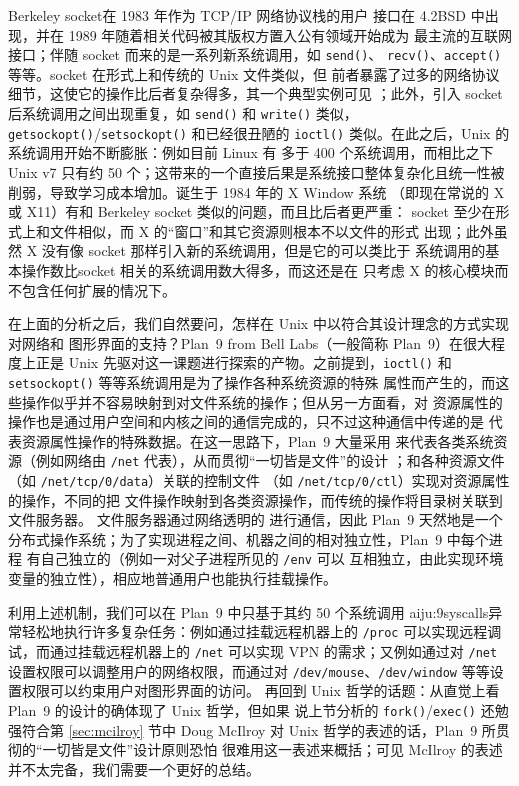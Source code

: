 Berkeley socket在 1983 年作为 TCP/IP 网络协议栈的用户
接口在 4.2BSD 中出现，并在 1989 年随着相关代码被其版权方置入公有领域开始成为
最主流的互联网接口；伴随 socket 而来的是一系列新系统调用，如 \verb|send()|、%
\verb|recv()|、\verb|accept()| 等等。socket 在形式上和传统的 Unix 文件类似，但
前者暴露了过多的网络协议细节，这使它的操作比后者复杂得多，其一个典型实例可见
\parencite{pike2001}；此外，引入 socket 后系统调用之间出现重复，如 \verb|send()|
和 \verb|write()| 类似，\verb|getsockopt()|/\verb|setsockopt()| 和已经很丑陋的
\verb|ioctl()| 类似。在此之后，Unix 的系统调用开始不断膨胀：例如目前 Linux 有
多于 400 个系统调用，而相比之下 Unix v7 只有约 50
个；这带来的一个直接后果是系统接口整体复杂化且统一性被
削弱，导致学习成本增加。诞生于 1984 年的 X Window 系统%
（即现在常说的 X 或 X11）有和 Berkeley socket 类似的问题，而且比后者更严重：%
socket 至少在形式上和文件相似，而 X 的“窗口”和其它资源则根本不以文件的形式
出现；此外虽然 X 没有像 socket 那样引入新的系统调用，但是它的可以类比于
系统调用的基本操作数比socket 相关的系统调用数大得多，而这还是在
只考虑 X 的核心模块而不包含任何扩展的情况下。

在上面的分析之后，我们自然要问，怎样在 Unix 中以符合其设计理念的方式实现对网络和
图形界面的支持？Plan~9 from Bell Labs（一般简称 Plan~9）在很大程度上正是 Unix
先驱对这一课题进行探索的产物。之前提到，\verb|ioctl()|
和 \verb|setsockopt()| 等等系统调用是为了操作各种系统资源的特殊
属性而产生的，而这些操作似乎并不容易映射到对文件系统的操作；但从另一方面看，对
资源属性的操作也是通过用户空间和内核之间的通信完成的，只不过这种通信中传递的是
代表资源属性操作的特殊数据。在这一思路下，Plan~9 大量采用%
来代表各类系统资源（例如网络由 \verb|/net| 代表），从而贯彻“一切皆是文件”的设计%
；和各种资源文件（如 \verb|/net/tcp/0/data|）关联的控制文件
（如 \verb|/net/tcp/0/ctl|）实现对资源属性的操作，不同的把
文件操作映射到各类资源操作，而传统的操作将目录树关联到文件服务器。
文件服务器通过网络透明的 进行通信，因此 Plan~9 天然地是一个
分布式操作系统；为了实现进程之间、机器之间的相对独立性，Plan~9 中每个进程
有自己独立的（例如一对父子进程所见的 \verb|/env| 可以
互相独立，由此实现环境变量的独立性），相应地普通用户也能执行挂载操作。

利用上述机制，我们可以在 Plan~9 中只基于其约 50 个系统调用\cupercite%
{aiju:9syscalls}异常轻松地执行许多复杂任务：例如通过挂载远程机器上的
\verb|/proc| 可以实现远程调试，而通过挂载远程机器上的 \verb|/net| 可以实现
VPN 的需求；又例如通过对 \verb|/net| 设置权限可以调整用户的网络权限，而通过对
\verb|/dev/mouse|、\verb|/dev/window| 等等设置权限可以约束用户对图形界面的访问。
再回到 Unix 哲学的话题：从直觉上看 Plan~9 的设计的确体现了 Unix 哲学，但如果
说上节分析的 \verb|fork()|/\verb|exec()| 还勉强符合第 \ref{sec:mcilroy} 节中
Doug McIlroy 对 Unix 哲学的表述的话，Plan~9 所贯彻的“一切皆是文件”设计原则恐怕
很难用这一表述来概括；可见 McIlroy 的表述并不太完备，我们需要一个更好的总结。

